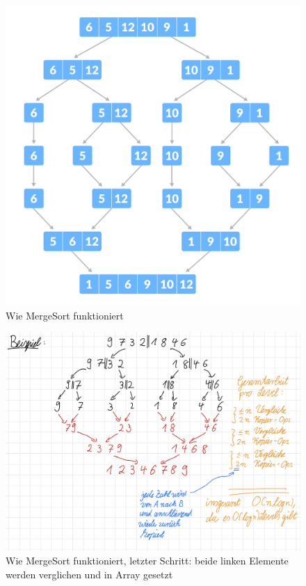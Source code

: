 \documentclass[a4paper]{article}
\begin{document}
    \begin{figure}[h]
        \centering
        \includegraphics[scale = 0.203]{Pictures/merge-sort-example_0.png} %
        \caption{Wie MergeSort funktioniert}
        \label{fig:MergeSort1}
    \end{figure}

        \begin{figure}[h]
        \centering
        \includegraphics[width = \textwidth]{Pictures/MergeSort, Vergleiche und Schreiboperationen.png} %
        \caption{Wie MergeSort funktioniert, letzter Schritt: beide linken Elemente werden verglichen und in Array gesetzt}
        \label{fig:MergeSort2}
    \end{figure}
        
\end{document}
